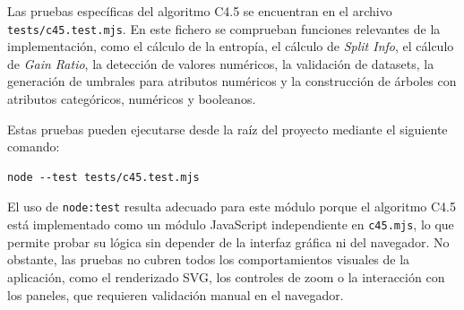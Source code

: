 Las pruebas específicas del algoritmo C4.5 se encuentran en el archivo \texttt{tests/c45.test.mjs}. En este fichero se comprueban funciones relevantes de la implementación, como el cálculo de la entropía, el cálculo de \textit{Split Info}, el cálculo de \textit{Gain Ratio}, la detección de valores numéricos, la validación de datasets, la generación de umbrales para atributos numéricos y la construcción de árboles con atributos categóricos, numéricos y booleanos.

Estas pruebas pueden ejecutarse desde la raíz del proyecto mediante el siguiente comando:

\begin{verbatim}
node --test tests/c45.test.mjs
\end{verbatim}

El uso de \texttt{node:test} resulta adecuado para este módulo porque el algoritmo C4.5 está implementado como un módulo JavaScript independiente en \texttt{c45.mjs}, lo que permite probar su lógica sin depender de la interfaz gráfica ni del navegador. No obstante, las pruebas no cubren todos los comportamientos visuales de la aplicación, como el renderizado SVG, los controles de zoom o la interacción con los paneles, que requieren validación manual en el navegador.